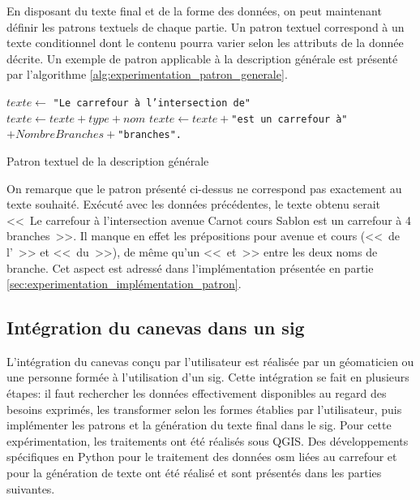 \label{sec:experimentation_preparation_patron}

En disposant du texte final et de la forme des données, on peut maintenant définir les patrons textuels de chaque partie. Un patron textuel correspond à un texte conditionnel dont le contenu pourra varier selon les attributs de la donnée décrite. Un exemple de patron applicable à la description générale est présenté par l'algorithme \ref{alg:experimentation_patron_generale}.

\begin{algorithm}
    \vspace{0.3cm}
    $texte \leftarrow $ \texttt{"Le carrefour à l'intersection de"}\\
     {
        $texte \leftarrow texte + type + nom$
    }
    $texte \leftarrow texte +$\texttt{"est un carrefour à"}$+ NombreBranches+$\texttt{"branches".}
    \vspace{0.3cm}
    \caption[Patron textuel de la description générale]{Patron textuel de la description générale}

\label{alg:experimentation_patron_generale}
\end{algorithm}

On remarque que le patron présenté ci-dessus ne correspond pas exactement au texte souhaité. Exécuté avec les données précédentes, le texte obtenu serait <<~Le carrefour à l'intersection avenue Carnot cours Sablon est un carrefour à 4 branches~>>. Il manque en effet les prépositions pour avenue et cours (<<~de l'~>> et <<~du~>>), de même qu'un <<~et~>> entre les deux noms de branche. Cet aspect est adressé dans l'implémentation présentée en partie \ref{sec:experimentation_implémentation_patron}.

\subsection{Intégration du canevas dans un \gls{sig}}

L'intégration du canevas conçu par l'utilisateur est réalisée par un géomaticien ou une personne formée à l'utilisation d'un \gls{sig}. Cette intégration se fait en plusieurs étapes: il faut rechercher les données effectivement disponibles au regard des besoins exprimés, les transformer selon les formes établies par l'utilisateur, puis implémenter les patrons et la génération du texte final dans le \gls{sig}. Pour cette expérimentation, les traitements ont été réalisés sous QGIS. Des développements spécifiques en Python pour le traitement des données \gls{osm} liées au carrefour et pour la génération de texte ont été réalisé et sont présentés dans les parties suivantes.

